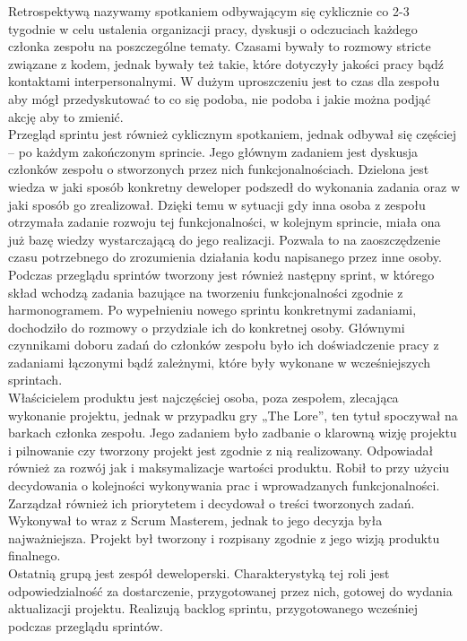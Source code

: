 \documentclass[oneside,polski,logo]{amuthesis}
\begin{document}
Retrospektywą nazywamy spotkaniem odbywającym się cyklicznie co 2-3 tygodnie w celu ustalenia organizacji pracy, dyskusji o odczuciach każdego członka zespołu na poszczególne tematy. Czasami bywały to rozmowy stricte związane z kodem, jednak bywały też takie, które dotyczyły jakości pracy bądź kontaktami interpersonalnymi. W dużym uproszczeniu jest to czas dla zespołu aby mógł przedyskutować to co się podoba, nie podoba i jakie można podjąć akcję aby to zmienić. \\

Przegląd sprintu jest również cyklicznym spotkaniem, jednak odbywał się częściej – po każdym zakończonym sprincie. Jego głównym zadaniem jest dyskusja członków zespołu o stworzonych przez nich funkcjonalnościach. Dzielona jest wiedza w jaki sposób konkretny deweloper podszedł do wykonania zadania oraz w jaki sposób go zrealizował. Dzięki temu w sytuacji gdy inna osoba z zespołu otrzymała zadanie rozwoju tej funkcjonalności, w kolejnym sprincie, miała ona już bazę wiedzy wystarczającą do jego realizacji. Pozwala to na zaoszczędzenie czasu potrzebnego do zrozumienia działania kodu napisanego przez inne osoby. Podczas przeglądu sprintów tworzony jest również następny sprint, w którego skład wchodzą zadania bazujące na tworzeniu funkcjonalności zgodnie z harmonogramem. Po wypełnieniu nowego sprintu konkretnymi zadaniami, dochodziło do rozmowy o przydziale ich do konkretnej osoby. Głównymi czynnikami doboru zadań do członków zespołu było ich doświadczenie pracy z zadaniami łączonymi bądź zależnymi, które były wykonane w wcześniejszych sprintach. \\

Właścicielem produktu jest najczęściej osoba, poza zespołem, zlecająca wykonanie projektu, jednak w przypadku gry „The Lore”, ten tytuł spoczywał na barkach członka zespołu. Jego zadaniem było zadbanie o klarowną wizję projektu i pilnowanie czy tworzony projekt jest zgodnie z nią realizowany. Odpowiadał również za rozwój jak i maksymalizacje wartości produktu. Robił to przy użyciu decydowania o kolejności wykonywania prac i wprowadzanych funkcjonalności. Zarządzał również ich priorytetem i decydował o treści tworzonych zadań. Wykonywał to wraz z Scrum Masterem, jednak to jego decyzja była najważniejsza. Projekt był tworzony i rozpisany zgodnie z jego wizją produktu finalnego.\\

Ostatnią grupą jest zespół deweloperski. Charakterystyką tej roli jest odpowiedzialność za dostarczenie, przygotowanej przez nich, gotowej do wydania aktualizacji projektu. Realizują backlog sprintu, przygotowanego wcześniej podczas przeglądu sprintów.
\end{document}
